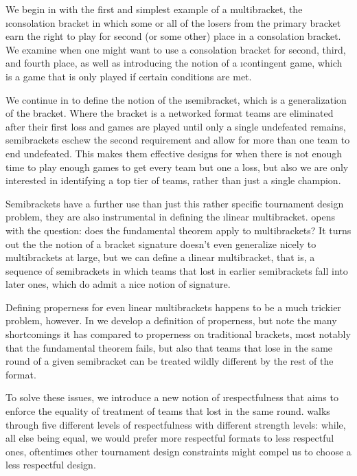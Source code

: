 {    We begin in  with the first and simplest example of a multibracket, the \i{consolation bracket} in which some or all of the losers from the primary bracket earn the right to play for second (or some other) place in a consolation bracket. We examine when one might want to use a consolation bracket for second, third, and fourth place, as well as introducing the notion of a \i{contingent game}, which is a game that is only played if certain conditions are met.

    We continue in  to define the notion of the \i{semibracket}, which is a generalization of the bracket. Where the bracket is a networked format teams are eliminated after their first loss and games are played until only a single undefeated remains, semibrackets eschew the second requirement and allow for more than one team to end undefeated. This makes them effective designs for when there is not enough time to play enough games to get every team but one a loss, but also we are only interested in identifying a top tier of teams, rather than just a single champion.

    Semibrackets have a further use than just this rather specific tournament design problem, they are also instrumental in defining the \i{linear multibracket}.  opens with the question: does the fundamental theorem apply to multibrackets? It turns out the the notion of a bracket signature doesn't even generalize nicely to multibrackets at large, but we can define a \i{linear multibracket}, that is, a sequence of semibrackets in which teams that lost in earlier semibrackets fall into later ones, which do admit a nice notion of signature.

    Defining properness for even linear multibrackets happens to be a much trickier problem, however. In  we develop a definition of properness, but note the many shortcomings it has compared to properness on traditional brackets, most notably that the fundamental theorem fails, but also that teams that lose in the same round of a given semibracket can be treated wildly different by the rest of the format.

    To solve these issues, we introduce a new notion of \i{respectfulness} that aims to enforce the equality of treatment of teams that lost in the same round.  walks through five different levels of respectfulness with different strength levels: while, all else being equal, we would prefer more respectful formats to less respectful ones, oftentimes other tournament design constraints might compel us to choose a less respectful design.

}
